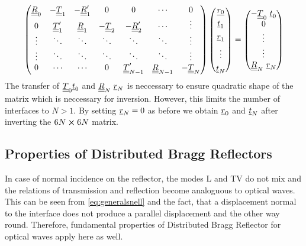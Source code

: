 \begin{equation}
    \begin{pmatrix}
        \underline{\underline{R}}_0         & -\underline{\underline{T}}_1           & -\underline{\underline{R}}_1^\prime &
        0
                             & 0                       & \cdots               &
        0
        \\
        0                    & \underline{\underline{T}}_1^\prime     & \underline{\underline{R}}_1         &
        -\underline{\underline{T}}_2        &
        -\underline{\underline{R}}_2^\prime & \cdots                  & \vdots
        \\
        \vdots               & \ddots                  & \ddots               &
        \ddots               & \ddots                  & \ddots               &
        \vdots
        \\
        \vdots               & \ddots                  & \ddots               &
        \ddots               & \ddots                  & \ddots               &
        \vdots
        \\
        0                    & \cdots                  & \cdots               &
        0
                             & \underline{\underline{T}}_{N-1}^\prime & \underline{\underline{R}}_{N-1}
                             &
        -\underline{\underline{T}}_{N}

    \end{pmatrix}
    \begin{pmatrix}
        \underline{r_0} \\[4pt] \underline{t}_1 \\[4pt] \underline{r}_1 \\[4pt] \vdots
        \\[4pt] \underline{t}_{N}
    \end{pmatrix}
    =
    \begin{pmatrix}
        -\underline{\underline{T}}_0\ \underline{t}_0 \\ 0 \\ \vdots \\ \vdots \\ \underline{\underline{R}}_{N}\
        \underline{r}_N
    \end{pmatrix}
\end{equation}
The transfer of $\underline{\underline{T}}_0\underline{t}_0$ and $\underline{\underline{R}}_{N}\ \underline{r}_N$
is neccessary to ensure quadratic shape of the matrix which is neccessary for
inversion. However, this limits the number of interfaces to $N > 1$.
By setting $\underline{r}_N = 0$ as before we obtain
$\underline{r}_0$ and $\underline{t}_N$ after inverting the $6N\cross 6N$ matrix.

\subsection{Properties of Distributed Bragg Reflectors}
In case of normal incidence on the reflector, the modes L and TV do not mix
and the relations of transmission and reflection become analoguous to optical
waves. This can be seen from \ref{eq:generalsnell} and the fact, that a
displacement normal to the interface does not produce a parallel displacement
and the other way round.
Therefore, fundamental properties of Distributed Bragg Reflector for optical
waves apply here as well.

